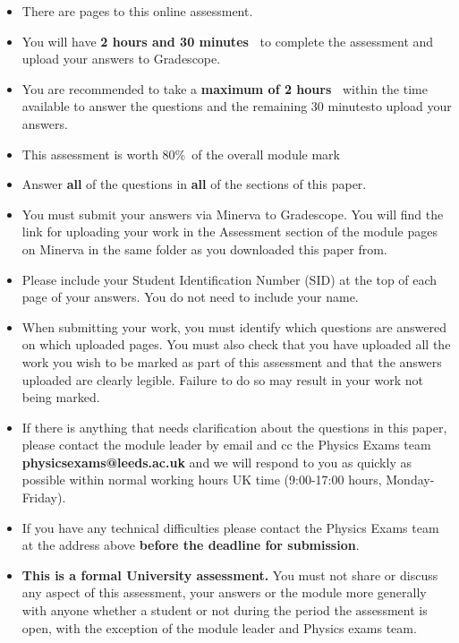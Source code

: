 \documentclass[12pt]{article}
\def\totaltime{2 hours and 30 minutes\ } %
\def\answertime{2 hours\ } %
\def\uploadtime{30 minutes}%
\def\paperweight{80\%\ }
\begin{document}
\begin{itemize}[itemsep=0pt,topsep=0pt]
\item There are \pageref{LastPage} pages to this online assessment.
\item You will have \textbf{\totaltime} to complete the assessment and upload your answers to Gradescope.
\item You are recommended to take a \textbf{maximum of \answertime} within the time available to answer the questions and the remaining \uploadtime to upload your answers. 
\item This assessment is worth \paperweight of the overall module mark
\item Answer \textbf{all} of the questions in \textbf{all} of the sections of this paper.
\item You must submit your answers via Minerva to Gradescope. You will find the link for uploading your work in the Assessment section of the module pages on Minerva in the same folder as you downloaded this paper from.
\item Please include your Student Identification Number (SID) at the top of each page of your answers. You do not need to include your name.
\item When submitting your work, you must identify which questions are answered on which uploaded pages. You must also check that you have uploaded all the work you wish to be marked as part of this assessment and that the answers uploaded are clearly legible. Failure to do so may result in your work not being marked.
\item If there is anything that needs clarification about the questions in this paper, please contact the module leader by email and cc the Physics Exams team \textbf{physicsexams@leeds.ac.uk} and we will respond to you as quickly as possible within normal working hours UK time (9:00-17:00 hours, Monday-Friday). 
\item If you have any technical difficulties please contact the Physics Exams team at the address above \textbf{before the deadline for submission}.
\item \textbf{This is a formal University assessment.} You must not share or discuss any aspect of this assessment, your answers or the module more generally with anyone whether a student or not during the period the assessment is open, with the exception of the module leader and Physics exams team.
\end{itemize}	
	
\end{document}
